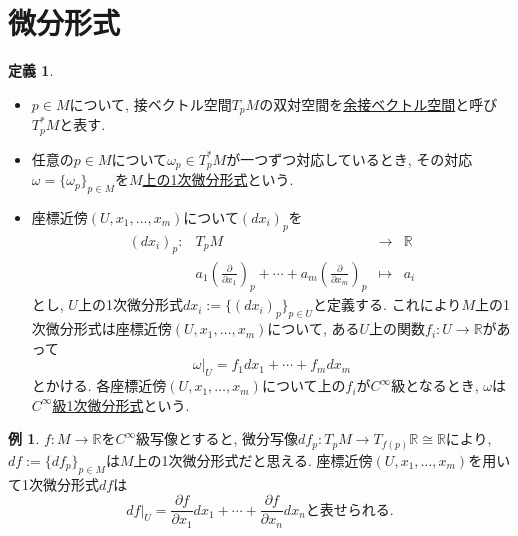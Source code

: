 \documentclass[dvipdfmx,a4paper,11pt]{article}
\newcommand{\R}{\mathbb{R}}
\theoremstyle{definition}
\newtheorem{dfn}[thm]{定義}
\newtheorem{exa}[thm]{例}
\newcommand{\pdrv}[2]{\frac{\partial #1}{\partial #2}}
\begin{document}
\section{微分形式}
    \begin{tcolorbox}[
    colback = white,
    colframe = green!35!black,
    fonttitle = \bfseries,
    breakable = true]
\begin{dfn}

\begin{itemize}
 \setlength{\parskip}{0cm}
  \setlength{\itemsep}{2pt} 
\item $p \in M$について, 接ベクトル空間$T_{p}M$の双対空間を\underline{余接ベクトル空間}と呼び$T_{p}^{*}M$と表す.
\item 任意の$p \in M$について$\omega_{p} \in T_{p}^{*}M$が一つずつ対応しているとき, その対応$\omega = \{ \omega_p\}_{p \in M}$を\underline{$M$上の1次微分形式}という.
\item 座標近傍$(U, x_1, \ldots, x_m)$について$(dx_{i})_{p}$を
    $$
     \begin{matrix}
    (dx_i )_{p} : &T_{p}M & \rightarrow &\R\\
    & a_1\left( \pdrv{}{x_1}\right)_p  + \cdots + a_m\left(\pdrv{}{x_m}\right)_p & \mapsto  &a_i
    \end{matrix}
     $$
    とし, $U$上の1次微分形式$dx_i  := \{ (dx_{i})_p\}_{p \in U}$と定義する. これにより$M$上の1次微分形式は座標近傍$(U, x_1, \ldots, x_m)$について, ある$U$上の関数$f_i : U \rightarrow \R$があって
    $$
    \omega|_{U} = f_1dx_1 + \cdots + f_mdx_m
    $$
    とかける. 各座標近傍$(U, x_1, \ldots, x_m)$について上の$f_i $が$C^{\infty}$級となるとき, $\omega$は\underline{$C^{\infty}$級1次微分形式}という.
    
\end{itemize}
    \end{dfn}
    \end{tcolorbox}
    
   \begin{exa}
$f : M\rightarrow \R$を$C^{\infty}$級写像とすると, 微分写像$df_{p} : T_{p}M \rightarrow T_{f(p)}\R \cong \R$により, $df:= \{df_{p}\}_{p \in M}$は$M$上の1次微分形式だと思える.
 座標近傍$(U, x_1, \ldots, x_m)$を用いて1次微分形式$df$は
 $$
 df|_{U} = \pdrv{f}{x_1} dx_1 + \cdots +\pdrv{f}{x_n}dx_{n}
 \text{と表せられる.}
 $$
\end{exa}
    
\end{document}

